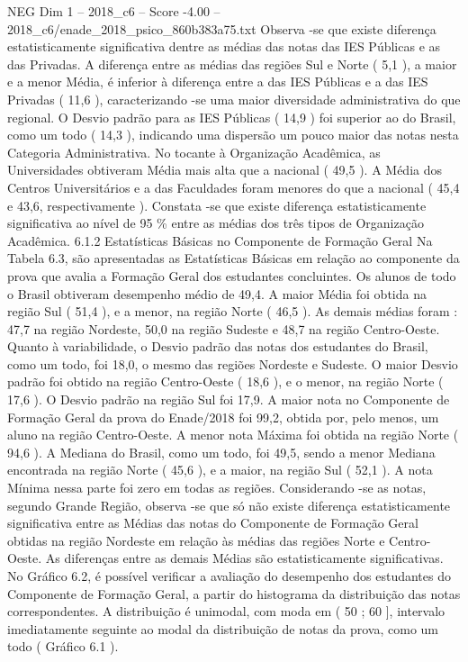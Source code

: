 \begin{textsample}{NEG Dim 1 – 2018\_c6 – Score -4.00 – 2018\_c6/enade\_2018\_psico\_860b383a75.txt}
Observa -se que existe diferença estatisticamente significativa dentre as médias das notas das IES Públicas e as das Privadas.
A diferença entre as médias das regiões Sul e Norte ( 5,1 ), a maior e a menor Média, é inferior à diferença entre a das IES Públicas e a das IES Privadas ( 11,6 ), caracterizando -se uma maior diversidade administrativa do que regional.
O Desvio padrão para as IES Públicas ( 14,9 ) foi superior ao do Brasil, como um todo ( 14,3 ), indicando uma dispersão um pouco maior das notas nesta Categoria Administrativa.
No tocante à Organização Acadêmica, as Universidades obtiveram Média mais alta que a nacional ( 49,5 ).
A Média dos Centros Universitários e a das Faculdades foram menores do que a nacional ( 45,4 e 43,6, respectivamente ).
Constata -se que existe diferença estatisticamente significativa ao nível de 95 \% entre as médias dos três tipos de Organização Acadêmica. 6.1.2 Estatísticas Básicas no Componente de Formação Geral Na Tabela 6.3, são apresentadas as Estatísticas Básicas em relação ao componente da prova que avalia a Formação Geral dos estudantes concluintes.
Os alunos de todo o Brasil obtiveram desempenho médio de 49,4.
A maior Média foi obtida na região Sul ( 51,4 ), e a menor, na região Norte ( 46,5 ).
As demais médias foram : 47,7 na região Nordeste, 50,0 na região Sudeste e 48,7 na região Centro-Oeste.
Quanto à variabilidade, o Desvio padrão das notas dos estudantes do Brasil, como um todo, foi 18,0, o mesmo das regiões Nordeste e Sudeste.
O maior Desvio padrão foi obtido na região Centro-Oeste ( 18,6 ), e o menor, na região Norte ( 17,6 ).
O Desvio padrão na região Sul foi 17,9.
A maior nota no Componente de Formação Geral da prova do Enade/2018 foi 99,2, obtida por, pelo menos, um aluno na região Centro-Oeste.
A menor nota Máxima foi obtida na região Norte ( 94,6 ).
A Mediana do Brasil, como um todo, foi 49,5, sendo a menor Mediana encontrada na região Norte ( 45,6 ), e a maior, na região Sul ( 52,1 ).
A nota Mínima nessa parte foi zero em todas as regiões.
Considerando -se as notas, segundo Grande Região, observa -se que só não existe diferença estatisticamente significativa entre as Médias das notas do Componente de Formação Geral obtidas na região Nordeste em relação às médias das regiões Norte e Centro-Oeste.
As diferenças entre as demais Médias são estatisticamente significativas.
No Gráfico 6.2, é possível verificar a avaliação do desempenho dos estudantes do Componente de Formação Geral, a partir do histograma da distribuição das notas correspondentes.
A distribuição é unimodal, com moda em ( 50 ; 60 ], intervalo imediatamente seguinte ao modal da distribuição de notas da prova, como um todo ( Gráfico 6.1 ).

\end{textsample}
